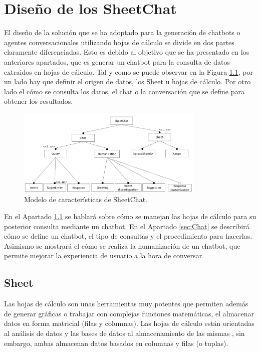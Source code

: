 \chapter{Diseño de los SheetChat}

El diseño de la solución que se ha adoptado para la generación de chatbots o agentes conversacionales utilizando hojas de cálculo se divide en dos partes claramente diferenciadas. Esto es debido al objetivo que se ha presentado en los anteriores apartados, que es generar un chatbot para la consulta de datos extraidos en hojas de cálculo. Tal y como se puede observar en la Figura \ref{fig:featureModel}, por un lado hay que definir el origen de datos, los Sheet u hojas de cálculo. Por otro lado el cómo se consulta los datos, el chat o la conversación que se define para obtener los resultados.

\begin{figure}[htb]
	\centering
	\includegraphics[width=0.8\textwidth]{./figs/FeatureModel.png}
	\caption{Modelo de características de SheetChat.} \label{fig:featureModel}
\end{figure}


En el Apartado \ref{sec:Sheet} se hablará sobre cómo se manejan las hojas de cálculo para su posterior consulta mediante un chatbot. En el Apartado \ref{sec:Chat} se describirá cómo se define un chatbot, el tipo de consultas y el procedimiento para hacerlas. Asimismo se mostrará el cómo se realiza la humanización de un chatbot, que permite mejorar la experiencia de usuario a la hora de conversar.

\section{Sheet}
\label{sec:Sheet}

Las hojas de cálculo son unas herramientas muy potentes que permiten además de generar gráficas o trabajar con complejas funciones matemáticas, el almacenar datos en forma matricial (filas y columnas). Las hojas de cálculo están orientadas al análisis de datos y las bases de datos al almacenamiento de las mismas \cite{Philips2014}, sin embargo, ambas almacenan datos basados en columnas y filas (o tuplas).

